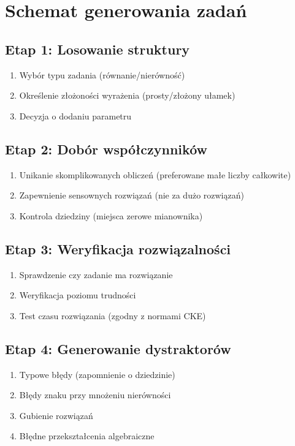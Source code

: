 \documentclass[12pt,a4paper]{article}
\begin{document}
\section{Schemat generowania zadań}

\subsection{Etap 1: Losowanie struktury}
\begin{enumerate}
    \item Wybór typu zadania (równanie/nierówność)
    \item Określenie złożoności wyrażenia (prosty/złożony ułamek)
    \item Decyzja o dodaniu parametru
\end{enumerate}

\subsection{Etap 2: Dobór współczynników}
\begin{enumerate}
    \item Unikanie skomplikowanych obliczeń (preferowane małe liczby całkowite)
    \item Zapewnienie sensownych rozwiązań (nie za dużo rozwiązań)
    \item Kontrola dziedziny (miejsca zerowe mianownika)
\end{enumerate}

\subsection{Etap 3: Weryfikacja rozwiązalności}
\begin{enumerate}
    \item Sprawdzenie czy zadanie ma rozwiązanie
    \item Weryfikacja poziomu trudności
    \item Test czasu rozwiązania (zgodny z normami CKE)
\end{enumerate}

\subsection{Etap 4: Generowanie dystraktorów}
\begin{enumerate}
    \item Typowe błędy (zapomnienie o dziedzinie)
    \item Błędy znaku przy mnożeniu nierówności
    \item Gubienie rozwiązań
    \item Błędne przekształcenia algebraiczne
\end{enumerate}
\end{document}
